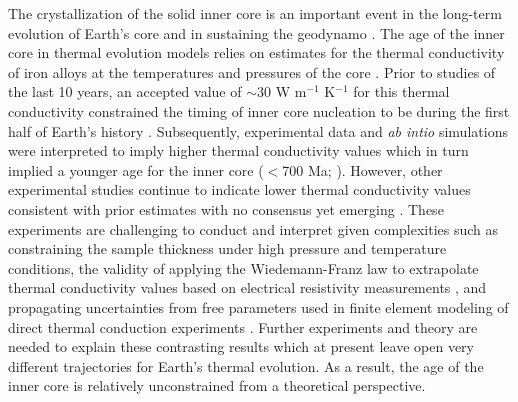 \documentclass[9pt,twocolumn,twoside,lineno]{pnas-new}
\begin{document}
The crystallization of the solid inner core is an important event in the long-term evolution of Earth's core and in sustaining the geodynamo \cite{Buffett2000a}. The age of the inner core in thermal evolution models relies on estimates for the thermal conductivity of iron alloys at the temperatures and pressures of the core \cite{Ohta2021a}. Prior to studies of the last 10 years, an accepted value of $\sim$30 W m$^{-1}$ K$^{-1}$ for this thermal conductivity constrained the timing of inner core nucleation to be during the first half of Earth's history \cite{Stacey2007a, Konopkova2016a}. Subsequently, experimental data and \textit{ab intio} simulations were interpreted to imply higher thermal conductivity values \cite{Pozzo2012a, Ohta2016a} which in turn implied a younger age for the inner core ($<$700 Ma; \citealp{Labrosse2015a}). However, other experimental studies continue to indicate lower thermal conductivity values consistent with prior estimates \cite{Konopkova2016a, Hsieh2020a} with no consensus yet emerging \cite{Williams2018a, Ohta2021a}. These experiments are challenging to conduct and interpret given complexities such as constraining the sample thickness under high pressure and temperature conditions, the validity of applying the Wiedemann-Franz law to extrapolate thermal conductivity values based on electrical resistivity measurements \cite{Ohta2016a}, and propagating uncertainties from free parameters used in finite element modeling of direct thermal conduction experiments \cite{Konopkova2016a}. Further experiments and theory are needed to explain these contrasting results which at present leave open very different trajectories for Earth's thermal evolution. As a result, the age of the inner core is relatively unconstrained from a theoretical perspective. 
\end{document}

